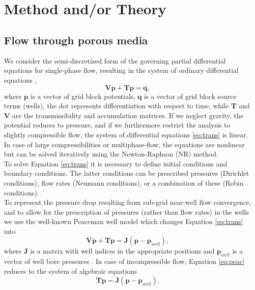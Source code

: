 \documentclass{ecmorXV}
\begin{document}
\section{Method and/or Theory}
\subsection{Flow through porous media}
\hspace{0.5cm}We consider the semi-discretized form of the governing partial 
differential equations for single-phase flow, resulting in the system of 
ordinary differential equations \cite{Jansen13}, 
\begin{equation}\label{eq:trans}
 \mathbf{V}\dot{\mathbf{p}}+\mathbf{T}\mathbf{p}=\mathbf{q},
\end{equation}
where $\mathbf{p}$ is a vector of grid block potentials, $\mathbf{q}$ is a vector of grid block source terms (wells), 
the dot represents differentiation with respect to time, while $\mathbf{T}$ and 
$\mathbf{V}$ are the transmissibility and accumulation matrices.
If we neglect gravity, the potential reduces to pressure, and if we furthermore restrict the analysis to slightly 
compressible flow, the system of differential equations \eqref{eq:trans} is linear. 
In case of large compressibilities or multiphase-flow, the equations are nonlinear but can be solved iteratively 
using the Newton-Raphson (NR) method.\\
To solve Equation \eqref{eq:trans} it is necessary to define initial conditions and boundary conditions.
The latter conditions can be prescribed pressures (Dirichlet conditions), 
flow rates (Neumann conditions), or a combination of these (Robin conditions).\\
To represent the pressure drop resulting from sub-grid near-well flow convergence, and to allow for the 
prescription of pressures (rather than flow rates) in the wells we use the well-known 
Peaceman well model which changes Equation  \eqref{eq:trans} into
 \begin{equation}\label{eq:peac}
  \mathbf{V}\dot{\mathbf{p}} + \mathbf{T}\mathbf{p} = \mathbf{J}(\mathbf{p}-\mathbf{p}_{well}),
\end{equation}
where $\mathbf{J}$ is a matrix with well indices in the appropriate positions and $\mathbf{p}_{well}$ is a 
vector of well bore pressures \cite{Jansen13}. In case of incompressible flow, Equation \eqref{eq:peac} reduces to 
the system of algebraic equations 
 \begin{equation}\label{eq:peac1}
\mathbf{T}\mathbf{p} = \mathbf{J}(\mathbf{p}-\mathbf{p}_{well}).
\end{equation}
\end{document}
